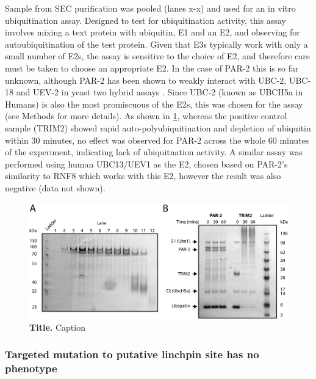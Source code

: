 \documentclass[12pt]{"article"}
\newcommand{\mycaption}[2]{\caption[#1]{\textbf{#1.} #2}}
\begin{document}
Sample from SEC purification was pooled (lanes x-x) and used for an in vitro ubiquitination assay. Designed to test for ubiquitination activity, this assay involves mixing a text protein with ubiquitin, E1 and an E2, and observing for autoubiquitination of the test protein. Given that E3s typically work with only a small number of E2s, the assay is sensitive to the choice of E2, and therefore care must be taken to choose an appropriate E2. In the case of PAR-2 this is so far unknown, although PAR-2 has been shown to weakly interact with UBC-2, UBC-18 and UEV-2 in yeast two hybrid assays \citep{Gudgen2004}. Since UBC-2 (known as UBCH5a in Humans) is also the most promiscuous of the E2s, this was chosen for the assay (see Methods for more details). As shown in \cref{fig:ubiquitin_assay}, whereas the positive control sample (TRIM2) showed rapid auto-polyubiquitination and depletion of ubiquitin within 30 minutes, no effect was observed for PAR-2 across the whole 60 minutes of the experiment, indicating lack of ubiquitnation activity. A similar assay was performed using human UBC13/UEV1 as the E2, chosen based on PAR-2's similarity to RNF8 which works with this E2, however the result was also negative (data not shown).\\

\begin{figure}[!h]
\includegraphics[scale=1]{ubiquitin_assay}
\setlength{\abovecaptionskip}{20pt}
\centering
\mycaption{Title}{Caption}
\label{fig:ubiquitin_assay}
\end{figure}


\clearpage
\subsubsection{Targeted mutation to putative linchpin site has no phenotype}
\end{document}
